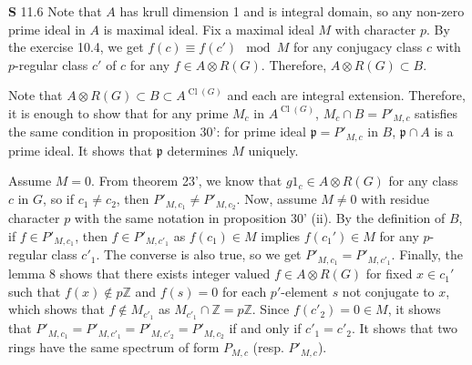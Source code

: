 \documentclass[a4paper, 12pt]{article}
\theoremstyle{Mydefinition}
\theoremstyle{Mytheorem}
\DeclareMathOperator{\cl}{Cl}
\begin{document}
\noindent \textbf{S} 11.6
Note that $A$ has krull dimension 1 and is integral domain, so any non-zero prime ideal in $A$ is maximal ideal. Fix a maximal ideal $M$ with character $p$. By the exercise 10.4, we get $f(c)\equiv f(c')\mod M$ for any conjugacy class $c$ with $p$-regular class $c'$ of $c$ for any $f\in A\otimes R(G)$. Therefore, $A\otimes R(G)\subset B$.

Note that $A\otimes R(G)\subset B\subset A^{\cl(G)}$ and each are integral extension. Therefore, it is enough to show that for any prime $M_c$ in $A^{\cl(G)}$, $M_c\cap B = P'_{M, c}$ satisfies the same condition in proposition 30': for prime ideal $\mathfrak{p} = P'_{M,c}$ in $B$, $\mathfrak{p}\cap A$ is a prime ideal. It shows that $\mathfrak{p}$ determines $M$ uniquely.

Assume $M=0$. From theorem 23', we know that $g1_c\in A\otimes R(G)$ for any class $c$ in $G$, so if $c_1\neq c_2$, then $P'_{M, c_1}\neq P'_{M, c_2}$. Now, assume $M\neq 0$ with residue character $p$ with the same notation in proposition 30' (ii). By the definition of $B$, if $f\in P'_{M,c_1}$, then $f\in P'_{M,c'_1}$ as $f(c_1)\in M$ implies $f(c_1')\in M$ for any $p$-regular class $c'_1$. The converse is also true, so we get $P'_{M,c_1} = P'_{M, c'_1}$. Finally, the lemma 8 shows that there exists integer valued $f\in A\otimes R(G)$ for fixed $x\in c_1'$ such that $f(x)\not\in p\mathbb{Z}$ and $f(s)=0$ for each $p'$-element $s$ not conjugate to $x$, which shows that $f\not\in M_{c'_1}$ as $M_{c'_1}\cap \mathbb{Z} = p\mathbb{Z}$. Since $f(c'_2) = 0\in M$, it shows that $P'_{M, c_1} = P'_{M, c'_1} = P'_{M, c'_2} = P'_{M, c_2}$ if and only if $c'_1=c'_2$. It shows that two rings have the same spectrum of form $P_{M, c}$ (resp. $P'_{M, c}$).
\end{document}
